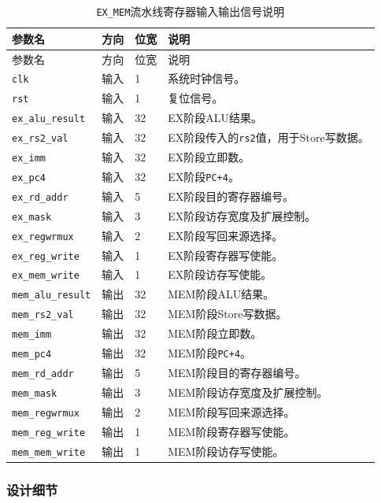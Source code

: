 \documentclass[UTF8,a4paper,12pt]{ctexart}
\newcommand{\code}[1]{\texttt{#1}}
\begin{document}
{\footnotesize
\renewcommand{\arraystretch}{1.12}
\begin{longtable}{p{3.2cm}p{1.5cm}p{2.1cm}p{7.0cm}}
\caption{\code{EX\_MEM}流水线寄存器输入输出信号说明}\\
\toprule
参数名 & 方向 & 位宽 & 说明 \\
\midrule
\endfirsthead
\toprule
参数名 & 方向 & 位宽 & 说明 \\
\midrule
\endhead
\code{clk} & 输入 & 1 & 系统时钟信号。 \\
\code{rst} & 输入 & 1 & 复位信号。 \\
\code{ex\_alu\_result} & 输入 & 32 & EX阶段ALU结果。 \\
\code{ex\_rs2\_val} & 输入 & 32 & EX阶段传入的\code{rs2}值，用于Store写数据。 \\
\code{ex\_imm} & 输入 & 32 & EX阶段立即数。 \\
\code{ex\_pc4} & 输入 & 32 & EX阶段\code{PC+4}。 \\
\code{ex\_rd\_addr} & 输入 & 5 & EX阶段目的寄存器编号。 \\
\code{ex\_mask} & 输入 & 3 & EX阶段访存宽度及扩展控制。 \\
\code{ex\_regwrmux} & 输入 & 2 & EX阶段写回来源选择。 \\
\code{ex\_reg\_write} & 输入 & 1 & EX阶段寄存器写使能。 \\
\code{ex\_mem\_write} & 输入 & 1 & EX阶段访存写使能。 \\
\code{mem\_alu\_result} & 输出 & 32 & MEM阶段ALU结果。 \\
\code{mem\_rs2\_val} & 输出 & 32 & MEM阶段Store写数据。 \\
\code{mem\_imm} & 输出 & 32 & MEM阶段立即数。 \\
\code{mem\_pc4} & 输出 & 32 & MEM阶段\code{PC+4}。 \\
\code{mem\_rd\_addr} & 输出 & 5 & MEM阶段目的寄存器编号。 \\
\code{mem\_mask} & 输出 & 3 & MEM阶段访存宽度及扩展控制。 \\
\code{mem\_regwrmux} & 输出 & 2 & MEM阶段写回来源选择。 \\
\code{mem\_reg\_write} & 输出 & 1 & MEM阶段寄存器写使能。 \\
\code{mem\_mem\_write} & 输出 & 1 & MEM阶段访存写使能。 \\
\bottomrule
\end{longtable}
}

\subsubsection*{设计细节}
\end{document}
